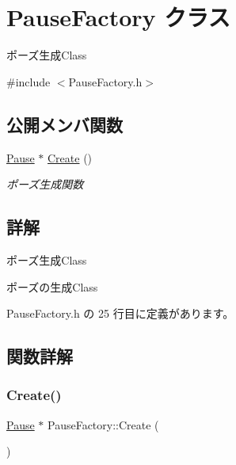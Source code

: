 \hypertarget{class_pause_factory}{}\section{Pause\+Factory クラス}
\label{class_pause_factory}


ポーズ生成\+Class  




{\ttfamily \#include $<$Pause\+Factory.\+h$>$}

\subsection*{公開メンバ関数}
\begin{DoxyCompactItemize}
\item 
\mbox{\hyperlink{class_pause}{Pause}} $\ast$ \mbox{\hyperlink{class_pause_factory_af18e43b2f37e8d56bf259f21414ea0e4}{Create}} ()
\begin{DoxyCompactList}\small\item\em ポーズ生成関数 \end{DoxyCompactList}\end{DoxyCompactItemize}


\subsection{詳解}
ポーズ生成\+Class 

ポーズの生成\+Class 

 Pause\+Factory.\+h の 25 行目に定義があります。



\subsection{関数詳解}
\mbox{\label{class_pause_factory_af18e43b2f37e8d56bf259f21414ea0e4}} 
\subsubsection{\texorpdfstring{Create()}{Create()}}
{\footnotesize\ttfamily \mbox{\hyperlink{class_pause}{Pause}} $\ast$ Pause\+Factory\+::\+Create (\begin{DoxyParamCaption}{ }\end{DoxyParamCaption})}



